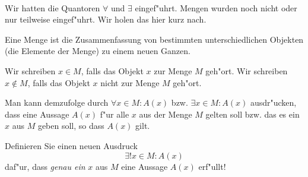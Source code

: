  \\
Wir hatten die Quantoren $\forall$ und $\exists$ eingef"uhrt. Mengen wurden noch nicht oder nur teilweise eingef"uhrt. 
Wir holen das hier kurz nach.
\begin{notes}
	Eine Menge ist die Zusammenfassung von bestimmten unterschiedlichen Objekten (die Elemente der Menge) zu einem neuen Ganzen.
	
	Wir schreiben $x\in M$, falls das Objekt $x$ zur Menge $M$ geh"ort.
	Wir schreiben $x\notin M$, falls das Objekt $x$ nicht zur Menge $M$ geh"ort. 
\end{notes}
Man kann demzufolge durch $\forall x\in M: A(x)$ bzw. $\exists x\in M: A(x)$ ausdr"ucken, dass eine Aussage $A(x)$ f"ur alle $x$ aus der Menge $M$ gelten soll bzw.
das es ein $x$ aus $M$ geben soll, so dass $A(x)$ gilt.

Definieren Sie einen neuen Ausdruck \[\exists !x\in M:A(x)\] daf"ur, dass \textit{genau ein} $x$ aus $M$ eine Aussage $A(x)$ erf"ullt!


